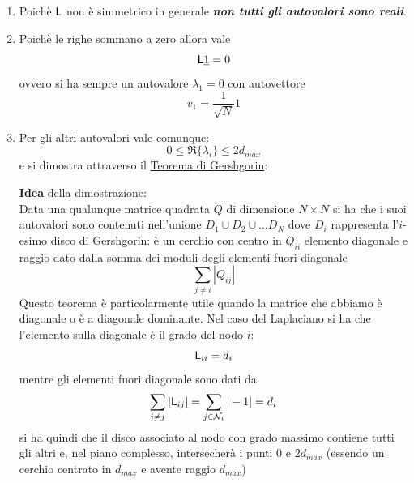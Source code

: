 \begin{enumerate}
\begin{mybox}{green}{}
\begin{center}
\end{center}
Il primo grafo \`e bilanciato mentre il secondo non lo \`e.
\end{mybox}
\item Poich\`e $\mathsf{L}$ non \`e simmetrico in generale \textit{\textbf{non tutti gli autovalori sono reali}}.
\item Poich\`e le righe sommano a zero allora vale 
  \[
  \mathsf{L} \underline{1} = 0
  \]
  ovvero si ha sempre un autovalore $\lambda_1 = 0$ con autovettore
  \[
  v_1 = \frac{1}{\sqrt{N}} \underline{1}
  \]
\item Per gli altri autovalori vale comunque:
  \[
  0 \leq \Re\{\lambda_i\} \leq 2 d_{max}
  \]
  e si dimostra attraverso il \href{https://en.wikipedia.org/wiki/Gershgorin_circle_theorem}{Teorema di Gershgorin}: \\
  \begin{tcolorbox}
  \textbf{Idea} della dimostrazione: \\
  Data una qualunque matrice quadrata $Q$ di dimensione $N \times N$ si ha che i suoi autovalori sono contenuti nell'unione $D_1 \cup D_2 \cup \dots D_N$ dove $D_i$ rappresenta l'$i$-esimo disco di Gershgorin: \`e un cerchio con centro in $Q_{ii}$ elemento diagonale e raggio dato dalla somma dei moduli degli elementi fuori diagonale
  \begin{equation}
  \sum_{j \neq i} |Q_{ij}|
  \end{equation}
  Questo teorema \`e particolarmente utile quando la matrice che abbiamo \`e diagonale o \`e a diagonale dominante. Nel caso del Laplaciano si ha che l'elemento sulla diagonale \`e il grado del nodo $i$:
  \begin{equation}
  \mathsf{L}_{ii} = d_i
  \end{equation}
  mentre gli elementi fuori diagonale sono dati da
  \begin{equation}
  \sum_{i \neq j} |\mathsf{L}_{ij}| = \sum_{j \in \mathcal{N}_i} |-1| = d_i
  \end{equation}
  si ha quindi che il disco associato al nodo con grado massimo contiene tutti gli altri e, nel piano complesso, intersecher\`a i punti $0$ e $2d_{max}$ (essendo un cerchio centrato in $d_{max}$ e avente raggio $d_{max}$)

\end{tcolorbox}
\end{enumerate}

